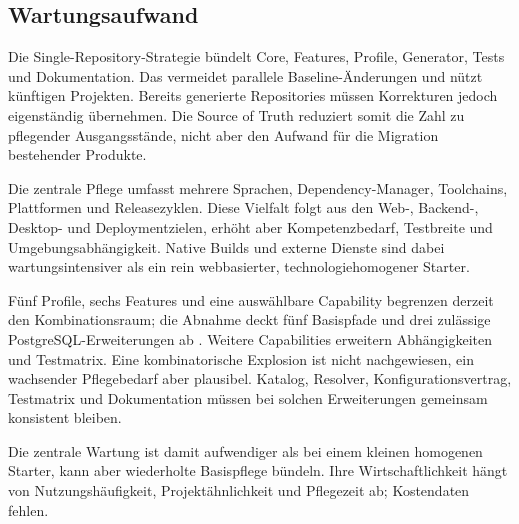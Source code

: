 \subsection{Wartungsaufwand}
\label{subsec:wartungsaufwand}

Die Single-Repository-Strategie bündelt Core, Features, Profile, Generator,
Tests und Dokumentation. Das vermeidet parallele Baseline-Änderungen und nützt
künftigen Projekten. Bereits generierte Repositories müssen Korrekturen jedoch
eigenständig übernehmen.
Die Source of Truth reduziert somit die Zahl zu pflegender Ausgangsstände,
nicht aber den Aufwand für die Migration bestehender Produkte.

Die zentrale Pflege umfasst mehrere Sprachen, Dependency-Manager, Toolchains,
Plattformen und Releasezyklen. Diese Vielfalt folgt aus den Web-, Backend-,
Desktop- und Deploymentzielen, erhöht aber Kompetenzbedarf, Testbreite und
Umgebungsabhängigkeit.
Native Builds und externe Dienste sind dabei wartungsintensiver als ein rein
webbasierter, technologiehomogener Starter.

Fünf Profile, sechs Features und eine auswählbare Capability begrenzen derzeit
den Kombinationsraum; die Abnahme deckt fünf Basispfade und drei zulässige
PostgreSQL-Erweiterungen ab \parencite{kleiveist2026acceptance}. Weitere
Capabilities erweitern Abhängigkeiten und Testmatrix. Eine kombinatorische
Explosion ist nicht nachgewiesen, ein wachsender Pflegebedarf aber plausibel.
Katalog, Resolver, Konfigurationsvertrag, Testmatrix und Dokumentation müssen
bei solchen Erweiterungen gemeinsam konsistent bleiben.

Die zentrale Wartung ist damit aufwendiger als bei einem kleinen homogenen
Starter, kann aber wiederholte Basispflege bündeln. Ihre Wirtschaftlichkeit
hängt von Nutzungshäufigkeit, Projektähnlichkeit und Pflegezeit ab; Kostendaten
fehlen.
